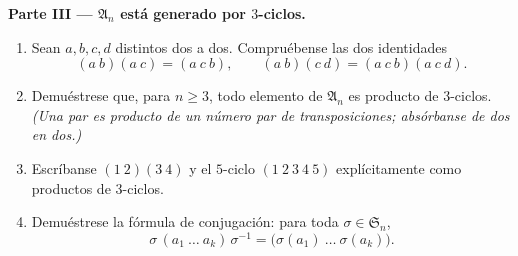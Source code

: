 \begin{problem}
\medskip
\noindent\textbf{Parte III --- $\mathfrak A_n$ está generado por
$3$-ciclos.}
\begin{enumerate}[resume]
  \item Sean $a, b, c, d$ distintos dos a dos. Compruébense las dos
        identidades
        \[
        (a\ b)(a\ c) = (a\ c\ b),
        \qquad
        (a\ b)(c\ d) = (a\ c\ b)(a\ c\ d) .
        \]
  \item Demuéstrese que, para $n \geq 3$, todo elemento de
        $\mathfrak A_n$ es producto de $3$-ciclos. \emph{(Una
         par es producto de un número par de
        transposiciones; absórbanse de dos en dos.)}
  \item Escríbanse $(1\ 2)(3\ 4)$ y el $5$-ciclo $(1\ 2\ 3\ 4\ 5)$
        explícitamente como productos de $3$-ciclos.
  \item Demuéstrese la fórmula de conjugación: para toda $\sigma \in
        \mathfrak S_n$,
        \[
        \sigma\,(a_1\ \dots\ a_k)\,\sigma^{-1}
        = \bigl(\sigma(a_1)\ \dots\ \sigma(a_k)\bigr) .
        \]
\end{enumerate}


\end{problem}
